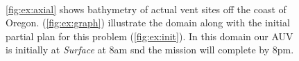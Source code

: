 \begin{figure}[!htb]
  \centering
  \\
  \hfill {}
  \caption{\small{\ref{fig:ex:axial} shows bathymetry of actual vent
      sites off the coast of Oregon. (\ref{fig:ex:graph}) illustrate 
      the domain along with the initial partial plan for
      this problem (\ref{fig:ex:init}). In this domain our AUV is
      initially at {\em Surface} at 8am snd the mission will complete
      by 8pm.}}
\label{fig:Example}
\end{figure}

